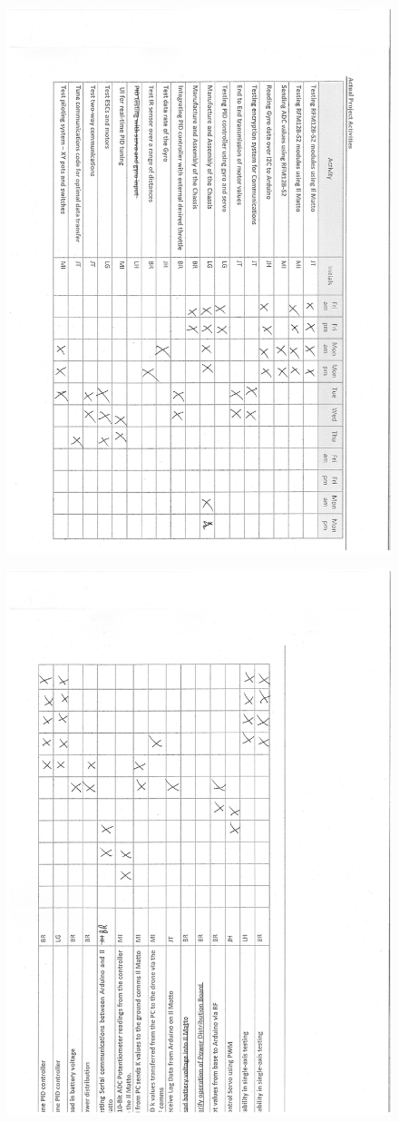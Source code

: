\documentclass[a4paper,11pt]{article}
\begin{document}
\begin{figure}[!htp]
\centering
\includegraphics[height=0.9\textwidth,angle=90]{PCF1.pdf}
\end{figure}
\FloatBarrier
\begin{figure}[!htp]
\centering
\includegraphics[height=0.9\textwidth,angle=-90]{PCF2.pdf}
\end{figure}
\FloatBarrier
\end{document}
